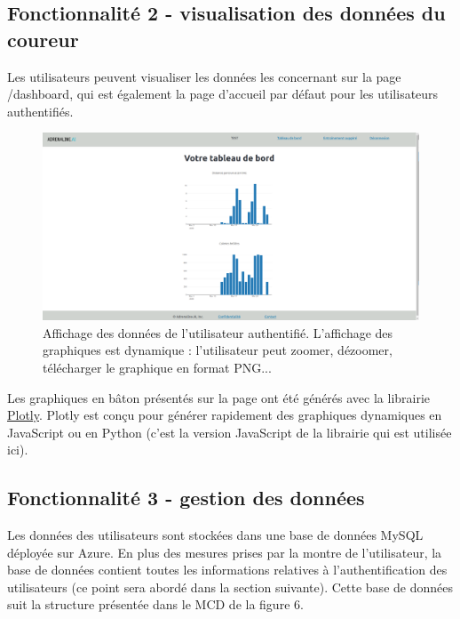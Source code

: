 \documentclass[french]{article}
\begin{document}
    \subsection{Fonctionnalité 2 - visualisation des données du coureur}

    Les utilisateurs peuvent visualiser les données les concernant sur la page /dashboard, qui est également la page d'accueil par défaut pour les utilisateurs authentifiés.
    \begin{figure}[h!]
        \includegraphics[width=12cm]{dashboard}
        \centering
        \caption{Affichage des données de l'utilisateur authentifié. L'affichage des graphiques est dynamique : l'utilisateur peut zoomer, dézoomer, télécharger le graphique en format PNG...}
        \centering
    \end{figure}

    Les graphiques en bâton présentés sur la page ont été générés avec la librairie \href{https://plotly.com/}{Plotly}. Plotly est conçu pour générer rapidement des graphiques dynamiques en JavaScript ou en Python (c'est la version JavaScript de la librairie qui est utilisée ici). 
    \subsection{Fonctionnalité 3 - gestion des données}
    Les données des utilisateurs sont stockées dans une base de données MySQL déployée sur Azure. En plus des mesures prises par la montre de l'utilisateur, la base de données contient toutes les informations relatives à l'authentification des utilisateurs (ce point sera abordé dans la section suivante).
    Cette base de données suit la structure présentée dans le MCD de la figure 6.
\end{document}

